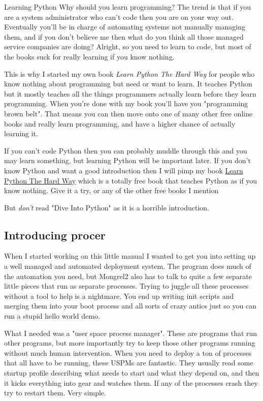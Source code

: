 \begin{aside}{Learning Python}
Why should you learn programming?  The trend is that if you are a system administrator
who can't code then you are on your way out.  Eventually you'll be in charge of automating
systems not manually managing them, and if you don't believe me then what do you think all
those managed service companies are doing?  Alright, so you need to learn to code, but
most of the books suck for really learning if you know nothing.

This is why I started my own book \emph{Learn Python The Hard Way} for people
who know nothing about programming but need or want to learn.  It teaches
Python but it mostly teaches all the things programmers actually learn before
they learn programming.  When you're done with my book you'll have you
"programming brown belt".  That means you can then move onto one of many other
free online books and really learn programming, and have a higher chance of
actually learning it.

If you can't code Python then you can probably muddle through this and you may
learn something, but learning Python will be important later.  If you don't
know Python and want a good introduction then I will pimp my book
\href{http://learnpythonthehardway.org}{Learn Python The Hard Way} which is a
totally free book that teaches Python as if you know nothing.  Give it a try,
or any of the other free books I mention

But \emph{don't} read "Dive Into Python" as it is a horrible introduction.
\end{aside}

\subsection{Introducing procer}

When I started working on this little manual I wanted to get you into setting up
a well managed and automated deployment system.  The  program does 
much of the automation you need, but Mongrel2 also has to talk to quite a few 
separate little pieces that run as separate processes.  Trying to juggle all these
processes without a tool to help is a nightmare.  You end up writing init scripts
and merging them into your boot process and all sorts of crazy antics just so you
can run a stupid hello world demo.

What I needed was a "user space process manager".  These are programs that run other
programs, but more importantly try to keep those other programs running without much
human intervention.  When you need to deploy a ton of processes that all have to
be running, these USPMs are fantastic.  They usually read some startup profile describing
what needs to start and what they depend on, and then it kicks everything into gear
and watches them.  If any of the processes crash they try to restart them.  Very simple.

